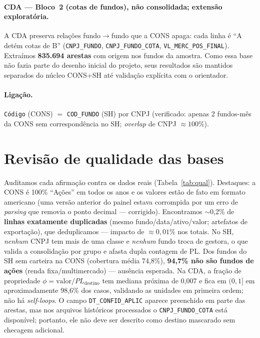 \documentclass[12pt,a4paper]{report}
\begin{document}
\paragraph{CDA --- Bloco~2 (cotas de fundos), não consolidada; extensão exploratória.} A CDA preserva
relações fundo$\to$fundo que a CONS apaga: cada linha é ``A detém cotas de B'' (\texttt{CNPJ\_FUNDO},
\texttt{CNPJ\_FUNDO\_COTA}, \texttt{VL\_MERC\_POS\_FINAL}). Extraímos \textbf{835.694 arestas} com origem nos
fundos da amostra. Como essa base não fazia parte do desenho inicial do projeto, seus resultados são
mantidos separados do núcleo CONS+SH até validação explícita com o orientador.

\paragraph{Ligação.} \texttt{Código} (CONS) $=$ \texttt{COD\_FUNDO} (SH) por CNPJ (verificado: apenas 2
fundos-mês da CONS sem correspondência no SH; \emph{overlap} de CNPJ $\approx 100\%$).

\section{Revisão de qualidade das bases}\label{sec:qualidade}
Auditamos cada afirmação contra os dados reais (Tabela~\ref{tab:qual}). Destaques: a CONS é 100\% ``Ações''
em todos os anos e os valores estão de fato em formato americano (uma versão anterior do painel estava
corrompida por um erro de \emph{parsing} que removia o ponto decimal --- corrigido). Encontramos $\sim$0,2\%
de \textbf{linhas exatamente duplicadas} (mesmo fundo/data/ativo/valor; artefatos de exportação), que
deduplicamos --- impacto de $\approx 0{,}01\%$ nos totais. No SH, \emph{nenhum} CNPJ tem mais de uma classe
e \emph{nenhum} fundo troca de gestora, o que valida a consolidação por grupo e afasta dupla contagem de PL.
Dos fundos do SH sem carteira na CONS (cobertura média 74,8\%), \textbf{94,7\% não são fundos de ações}
(renda fixa/multimercado) --- ausência esperada. Na CDA, a fração de propriedade
$\phi=\text{valor}/PL_{\text{destino}}$ tem mediana próxima de 0,007 e fica em $(0,1]$ em aproximadamente
98,6\% dos casos, validando as unidades em primeira ordem; não há \emph{self-loops}. O campo
\texttt{DT\_CONFID\_APLIC} aparece preenchido em parte das arestas, mas nos arquivos históricos processados
o \texttt{CNPJ\_FUNDO\_COTA} está disponível; portanto, ele não deve ser descrito como destino mascarado sem
checagem adicional.
\end{document}
